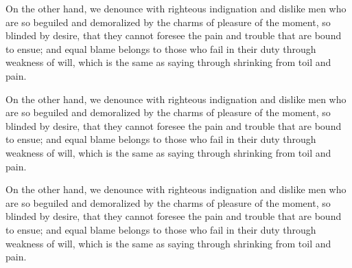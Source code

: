 On the other hand, we denounce with righteous indignation and dislike men who
are so beguiled and demoralized by the charms of pleasure of the moment, so
blinded by desire, that they cannot foresee the pain and trouble that are bound
to ensue; and equal blame belongs to those who fail in their duty through
weakness of will, which is the same as saying through shrinking from toil and
pain.

On the other hand, we denounce with righteous indignation and dislike men who
are so beguiled and demoralized by the charms of pleasure of the moment, so
blinded by desire, that they cannot foresee the pain and trouble that are bound
to ensue; and equal blame belongs to those who fail in their duty through
weakness of will, which is the same as saying through shrinking from toil and
pain.

On the other hand, we denounce with righteous indignation and dislike men who
are so beguiled and demoralized by the charms of pleasure of the moment, so
blinded by desire, that they cannot foresee the pain and trouble that are bound
to ensue; and equal blame belongs to those who fail in their duty through
weakness of will, which is the same as saying through shrinking from toil and
pain.

\begin{comment}
  \begin{hola}[index=zapto!hoasd]{Principio de seguridad de los
      alimentos.}{articulo-8}
    On the other hand, we denounce with righteous indignation and dislike men
    who are so beguiled and demoralized by the charms of pleasure of the moment,
    so blinded by desire, that they cannot foresee the pain and trouble that are
    bound to ensue; and equal blame belongs to those who fail in their duty
    through weakness of will, which is the same as saying through shrinking from
    toil and pain.

    \tcblower

    \hfill \texttt{Ley 17/2011, de 5 de julio, de Seguridad Alimentaria y
      Nutrición}

    \hfill \textit{Fuente}: \url{https://www.boe.es/}
  \end{hola}
\end{comment}

